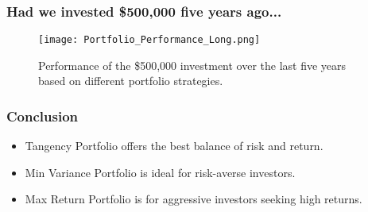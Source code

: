 \documentclass{beamer}
\begin{document}
\begin{frame}
\frametitle{Had we invested \$500,000 five years ago...}
\begin{figure}
    \centering
    \texttt{[image: Portfolio\_Performance\_Long.png]}  %
    \caption{Performance of the \$500,000 investment over the last five years based on different portfolio strategies.}
\end{figure}
\end{frame}

\begin{frame}
\frametitle{Conclusion}
\begin{itemize}
    \item Tangency Portfolio offers the best balance of risk and return.
    \item Min Variance Portfolio is ideal for risk-averse investors.
    \item Max Return Portfolio is for aggressive investors seeking high returns.
\end{itemize}
\end{frame}
\end{document}
